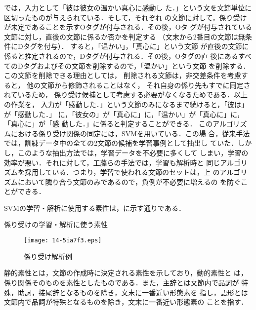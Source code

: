 \documentclass[japanese]{jnlp_1.3e}
\begin{document}
では，入力として「彼は彼女の温かい真心に感動し
た．」という文を文節単位に区切ったものが与えられている．そして，それぞれ
の文節に対して，係り受けが未定であることを示すOタグが付与される．その後，Oタ
グが付与されている文節に対し，直後の文節に係るか否かを判定する
（文末から2番目の文節は無条件にDタグを付与）．
すると，「温かい」，「真心に」という文節
が直後の文節に係ると推定されるので，Dタグが付与される．その後，Oタグの直
後にあるすべてのDタグおよびその文節を削除するので，「温かい」という文節
を削除する．この文節を削除できる理由としては，
削除される文節は，非交差条件を考慮すると，
他の文節から修飾されることはなく，
それ自身の係り先もすでに同定されているため，
係り受け候補として考慮する必要がなくなるためである．以上の作業を，
入力が「感動した．」という文節のみになるまで続けると，「彼は」が「感動した．」
に，「彼女の」が「真心に」に，「温かい」が「真心に」に，「真心に」が「感
動した．」に係ると判定することができる．
このアルゴリズムにおける係り受け関係の同定には，SVMを用いている．この場
合，従来手法では，訓練データ中の全ての2文節の候補を学習事例として抽出し
ていた．しかし，このような抽出方法では，学習データを不必要に多くして
しまい，学習の効率が悪い．それに対して，工藤らの手法では，学習も解析時と
同じアルゴリズムを採用している．つまり，学習で使われる文節のセットは，上
のアルゴリズムにおいて隣り合う文節のみであるので，負例が不必要に増えるの
を防ぐことができる．

SVMの学習・解析に使用する素性は，に示す通りである．


\begin{table}[b]
\setlength{\tabcolsep}{4pt}
    \caption{係り受けの学習・解析に使う素性}
    \label{tbl:feature}

\end{table}


\begin{figure}[b]
\begin{center}
\texttt{[image: 14-5ia7f3.eps]}
\end{center}
 \caption{係り受け解析例}
 \label{fig:feature_for_cabocha}
\end{figure}


静的素性とは，文節の作成時に決定される素性を示しており，動的素性と
は，係り関係そのものを素性としたものである．また，主辞とは文節内で品詞が
特殊，助詞，接尾辞となるものを除き，文末に一番近い形態素を
指し，語形とは文節内で品詞が特殊となるものを除き，文末に一番近い形態素の
ことを指す．
\end{document}

